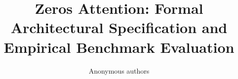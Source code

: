 \title{\textbf{Zeros Attention: Formal Architectural Specification and Empirical Benchmark Evaluation}}

\author{Anonymous authors}
